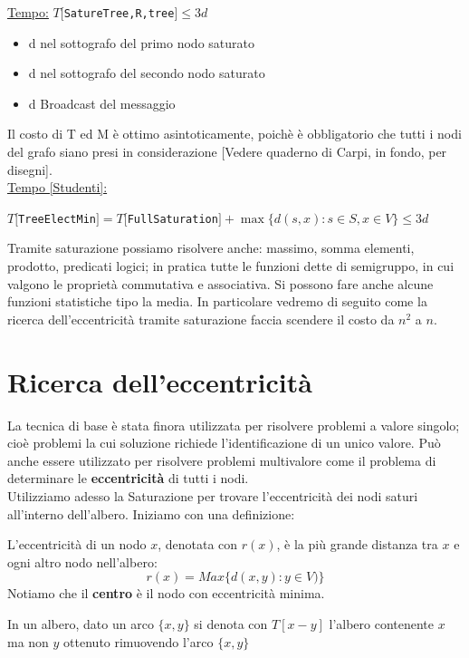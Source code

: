 \underline{Tempo:}
$T[$\texttt{SatureTree,R,tree}$] \leq 3d$
\begin{itemize}
    \item d nel sottografo del primo nodo saturato
    \item d nel sottografo del secondo nodo saturato
    \item d Broadcast del messaggio
\end{itemize}


Il costo di T ed M è ottimo asintoticamente, poichè è obbligatorio che tutti i
nodi del grafo siano presi in considerazione [Vedere quaderno di Carpi, in
        fondo, per disegni].\\
\underline{Tempo [Studenti]:}
\begin{center}
    $T[$\texttt{TreeElectMin}$] = T[$\texttt{FullSaturation}$] + \max \{ d(s, x) :
        s \in S, x \in V \} \leq 3d$
\end{center}

Tramite saturazione possiamo risolvere anche: massimo, somma elementi, prodotto,
predicati logici; in pratica tutte le funzioni dette di semigruppo, in cui
valgono le proprietà commutativa e associativa. Si possono fare anche alcune
funzioni statistiche tipo la media. In particolare vedremo di seguito come la
ricerca dell'eccentricità tramite saturazione faccia scendere il costo da $n^2$
a $n$.

\section{Ricerca dell'eccentricità}
La tecnica di base è stata finora utilizzata per risolvere problemi a valore
singolo; cioè problemi la cui soluzione richiede l'identificazione di un unico
valore. Può anche essere utilizzato per risolvere problemi multivalore come il
problema di determinare le \textbf{eccentricità} di tutti i nodi.\\
Utilizziamo adesso la Saturazione per trovare l'eccentricità dei nodi saturi
all'interno dell'albero. Iniziamo con una definizione:\\

\begin{definition}
    L'eccentricità di un nodo $x$, denotata con $r(x)$, è la più grande
    distanza tra $x$ e ogni altro nodo nell'albero: $$r(x) = Max\{d(x,y) : y \in
        V)\}$$ Notiamo che il \textbf{centro} è il nodo con eccentricità minima.
\end{definition}

\begin{definition}
    In un albero, dato un arco $\{x,y\}$ si denota con $T[x - y]$
    l'albero contenente $x$ ma non $y$ ottenuto rimuovendo l'arco $\{x,y\}$
\end{definition}

